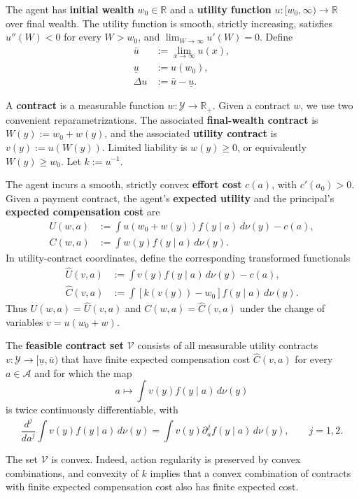 \documentclass[11pt]{article}
\theoremstyle{remark}
\newcommand{\R}{\mathbb R}
\newcommand{\dd}{\,d\nu}
\newcommand{\cA}{\mathcal A}
\newcommand{\cY}{\mathcal Y}
\begin{document}
The agent has \textbf{initial wealth} $w_0\in\R$ and a \textbf{utility function}
$u:[w_0,\infty)\to\R$ over final wealth.  The utility function is smooth,
strictly increasing, satisfies $u''(W)<0$ for every $W>w_0$, and
$\lim_{W\to\infty}u'(W)=0$.
Define
\[
\begin{aligned}
 \bar u&:=\lim_{x\to\infty}u(x),\\
 \underline u&:=u(w_0),\\
 \Delta u&:=\bar u-\underline u.
\end{aligned}
\]

A \textbf{contract} is a measurable function $w:\cY\to\R_+$.  Given a contract
$w$, we use two convenient reparametrizations.  The associated
\textbf{final-wealth contract} is $W(y):=w_0+w(y)$, and the associated
\textbf{utility contract} is $v(y):=u(W(y))$.  Limited liability is $w(y)\ge0$,
or equivalently $W(y)\ge w_0$.  Let $k:=u^{-1}$.

The agent incurs a smooth, strictly convex \textbf{effort cost} $c(a)$, with
$c'(a_0)>0$.  Given a payment contract, the agent's \textbf{expected utility}
and the principal's \textbf{expected compensation cost} are
\begin{align*}
 U(w,a)&:=\int u(w_0+w(y))f(y\mid a)\dd(y)-c(a),\\
 C(w,a)&:=\int w(y)f(y\mid a)\dd(y).
\end{align*}
In utility-contract coordinates, define the corresponding transformed
functionals
\begin{align*}
 \widehat U(v,a)&:=\int v(y)f(y\mid a)\dd(y)-c(a),\\
 \widehat C(v,a)&:=\int [k(v(y))-w_0]f(y\mid a)\dd(y).
\end{align*}
Thus $U(w,a)=\widehat U(v,a)$ and $C(w,a)=\widehat C(v,a)$ under the change of
variables $v=u(w_0+w)$.

The \textbf{feasible contract set} $\mathcal V$ consists of all measurable
utility contracts $v:\cY\to[\underline u,\bar u)$ that have finite expected
compensation cost $\widehat C(v,a)$ for every $a\in\cA$ and for which the map
\[
 a\longmapsto\int v(y)f(y\mid a)\dd(y)
\]
is twice continuously differentiable, with
\begin{equation}
 \frac{d^j}{da^j}\int v(y)f(y\mid a)\dd(y)
 =\int v(y)\partial_a^j f(y\mid a)\dd(y),
 \qquad j=1,2.
 \tag{Diff}\label{eq:contract-differentiation}
\end{equation}

The set $\mathcal V$ is convex.  Indeed, action regularity is preserved by
convex combinations, and convexity of $k$ implies that a convex combination of
contracts with finite expected compensation cost also has finite expected cost.
\end{document}
